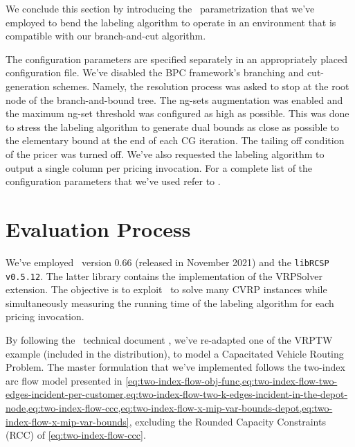 \medskip

We conclude this section by introducing the \bapcod\ parametrization
that we've employed to bend the labeling algorithm to operate in
an environment that is compatible with our branch-and-cut algorithm.

The configuration parameters are specified separately
in an appropriately placed configuration file.
We've disabled the BPC framework's branching and cut-generation schemes.
Namely, the resolution process was asked to stop at
the root node of the branch-and-bound tree.
The ng-sets augmentation was enabled and the maximum ng-set threshold was configured
as high as possible. This was done to stress the labeling algorithm to generate dual bounds as close
as possible to the elementary bound at the end of each CG iteration.
The tailing off condition of the pricer was turned off.
We've also requested the labeling algorithm to output a single column per pricing invocation.
For a complete list of the configuration parameters
that  we've used refer to .

\section{Evaluation Process}
\label{sec:results-evaluation-process}

We've employed \bapcod\ version 0.66 (released in November 2021) and the \texttt{libRCSP v0.5.12}.
The latter library contains the implementation of the VRPSolver extension.
The objective is to exploit \bapcod\ to solve many CVRP instances while simultaneously
measuring the running time of the labeling algorithm for each pricing invocation.

\medskip

By following the \bapcod\ technical document \parencite{sadykov2021},
we've re-adapted one of the VRPTW example (included in the distribution),
to model a Capacitated Vehicle Routing Problem.
The master formulation that we've implemented follows the two-index arc flow model
presented in \cref{eq:two-index-flow-obj-func,eq:two-index-flow-two-edges-incident-per-customer,eq:two-index-flow-two-k-edges-incident-in-the-depot-node,eq:two-index-flow-ccc,eq:two-index-flow-x-mip-var-bounds-depot,eq:two-index-flow-x-mip-var-bounds},
excluding the Rounded Capacity Constraints (RCC) of \cref{eq:two-index-flow-ccc}.

